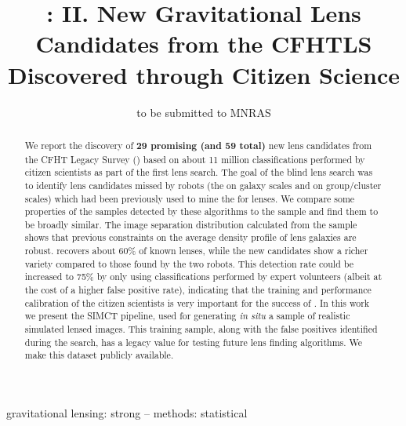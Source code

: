 \documentclass[useAMS,usenatbib,a4paper]{mn2e}
\title[New Gravitational Lens Candidates from CFHTLS]
{\SW: II. New Gravitational Lens Candidates from the CFHTLS Discovered
through Citizen Science}
\author[More et al.]{%
 
}
\begin{document}
\date{to be submitted to MNRAS}
\pagerange{\pageref{firstpage}--\pageref{lastpage}}

\maketitle

\label{firstpage}


\begin{abstract}
We report the discovery of {\bf 29 promising (and 59 total)} new lens
candidates from the CFHT Legacy Survey (\cfhtls) based on about 11
million classifications performed by citizen scientists as part of the
first \sw lens search.  The goal of the blind lens search was to
identify lens candidates missed by robots (the \rf on galaxy scales
and \af on group/cluster scales) which had been previously used to
mine the \cfhtls for lenses.  We compare some properties of the samples
detected by these algorithms to the \sw sample and find them to be
broadly similar.  The image separation distribution calculated from the
\sw sample shows that previous constraints on the average
density profile of lens galaxies are robust. \sw recovers about
60\% of known lenses, while the new candidates show a richer variety
compared to those found by the two robots. This detection rate could be
increased to 75\% by only using classifications performed by expert
volunteers (albeit at the cost of a higher false positive rate), indicating that
the training and performance calibration of the citizen
scientists is very important for the success of \sw. In this work
we present the SIMCT pipeline, used for generating {\it in situ}
a sample of realistic  simulated lensed
images.  This training sample, along with the
false positives identified during the
search, has a legacy value for testing
future lens finding algorithms. We make this dataset publicly
available.

\end{abstract}


\begin{keywords}
  gravitational lensing: strong   --
  methods: statistical
\end{keywords}

\setcounter{footnote}{1}

\end{document}
